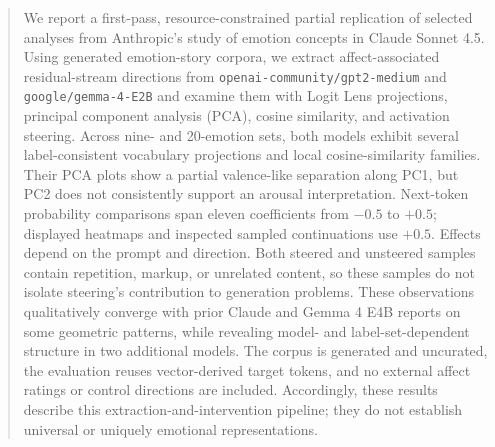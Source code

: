\begin{abstract}

We report a first-pass, resource-constrained partial replication of selected analyses from Anthropic's study of emotion 
concepts in Claude Sonnet 4.5. Using generated emotion-story corpora, we extract affect-associated residual-stream 
directions from \texttt{openai-community/gpt2-medium} and \texttt{google/gemma-4-E2B} and examine them with Logit
Lens projections, principal component analysis (PCA), cosine similarity, and activation steering. Across nine- and 
20-emotion sets, both models exhibit several label-consistent vocabulary projections and local cosine-similarity families. 
Their PCA plots show a partial valence-like separation along PC1, but PC2 does not consistently support an arousal interpretation. 
Next-token probability comparisons span eleven coefficients from $-0.5$ to $+0.5$; displayed heatmaps and inspected sampled
continuations use $+0.5$. Effects depend on the prompt and direction. Both steered and unsteered samples contain repetition,
markup, or unrelated content, so these samples do not isolate steering's contribution to generation problems. These observations
qualitatively converge with prior Claude and Gemma 4 E4B reports on some geometric patterns, while revealing model- and 
label-set-dependent structure in two additional models. The corpus is generated and uncurated, the evaluation reuses 
vector-derived target tokens, and no external affect 
ratings or control directions are included. Accordingly, these results describe this extraction-and-intervention pipeline; 
they do not establish universal or uniquely emotional representations.

\end{abstract}
